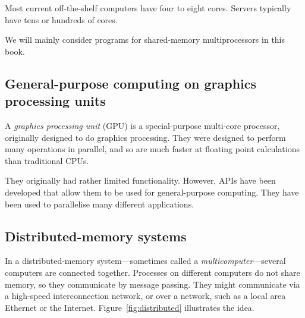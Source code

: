 Most current off-the-shelf computers have four to eight cores.  Servers
typically have tens or hundreds of cores.

We will mainly consider programs for shared-memory multiprocessors in this
book.
 


\subsection{General-purpose computing on graphics processing units}


A \emph{graphics processing unit} (GPU) is a special-purpose multi-core
processor, originally designed to do graphics processing.  They were designed
to perform many operations in parallel, and so are much faster at floating
point calculations than traditional
CPUs.

They originally had rather limited functionality.  However, APIs have
been developed that allow them to be used for general-purpose computing.  They
have been used to parallelise many different
applications.


\subsection{Distributed-memory systems}

In a distributed-memory system---sometimes called a
\emph{multicomputer}---several computers are connected together.  Processes on
different computers do not share memory, so they communicate by message
passing.  They might communicate via a high-speed interconnection network, or
over a network, such as a local area Ethernet or the Internet.
Figure~\ref{fig:distributed} illustrates the idea.


